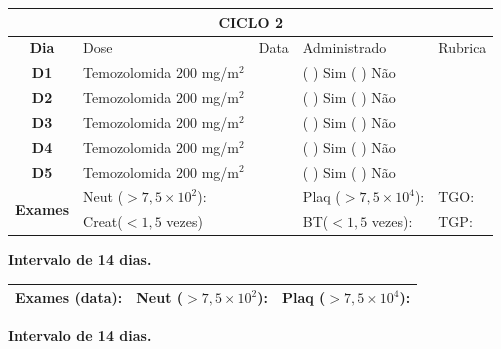 \documentclass[11pt,a4paper,oldfontcommands]{memoir}
\begin{document}
\begin{center}
\begin{longtable}{p{1cm}p{4cm}|p{1cm}|p{4.6cm}|p{3cm}}
	\hline
	\multicolumn{5}{c}{\textbf{CICLO 2}}\\
\hline
    \multicolumn{1}{c|}{\multirow{1}{*}{\textbf{Dia}}}&{Dose}&{Data}&{Administrado}&{Rubrica} \\
    \hline
    \multicolumn{1}{c|}{\multirow{1}{*}{\textbf{D1}}}&{Temozolomida \(200\) mg/m\(^2\)}&&{(  ) Sim (  ) Não}&\\
    \multicolumn{1}{c|}{\multirow{1}{*}{\textbf{D2}}}&{Temozolomida \(200\) mg/m\(^2\)}&&{(  ) Sim (  ) Não}&\\
    \multicolumn{1}{c|}{\multirow{1}{*}{\textbf{D3}}}&{Temozolomida \(200\) mg/m\(^2\)}&&{(  ) Sim (  ) Não}&\\
    \multicolumn{1}{c|}{\multirow{1}{*}{\textbf{D4}}}&{Temozolomida \(200\) mg/m\(^2\)}&&{(  ) Sim (  ) Não}&\\
    \multicolumn{1}{c|}{\multirow{1}{*}{\textbf{D5}}}&{Temozolomida \(200\) mg/m\(^2\)}&&{(  ) Sim (  ) Não}&\\
    \hline
    \multicolumn{1}{c|}{\multirow{2}{*}{\textbf{Exames}}}&\multicolumn{2}{l|}{Neut (\(>7,5\times10^2\)):}&{Plaq (\(>7,5\times10^4\)):}&{TGO:}\\
    \cline{2-5}
    \multicolumn{1}{c|}{\multirow{2}{*}{{}}}&\multicolumn{2}{l|}{Creat(\(<1,5\) vezes)}&{BT(\(<1,5\) vezes):}&{TGP:}
    \\
    \hline
\end{longtable}
\textbf{Intervalo de 14 dias.}
\begin{longtable}{p{5cm}|p{5cm}|p{4.5cm}}
    \hline
    \textbf{Exames (data):}&{Neut (\(>7,5\times10^2\)):}&{Plaq (\(>7,5\times10^4\)):}
    \\
    \hline
\end{longtable}
\textbf{Intervalo de 14 dias.}
\end{center}
\clearpage
\end{document}
